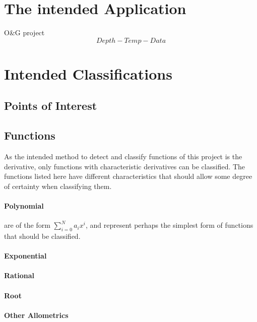 \documentclass[main.tex]{subfiles}
\begin{document}
    
  \section{The intended Application}
    
    O\&G project
    \[Depth-Temp-Data\]
    
  \section{Intended Classifications}
    
    \subsection{Points of Interest}  
      
    \subsection{Functions}
      
      As the intended method to detect and classify functions of this project is the derivative, only functions with characteristic derivatives can be classified. The functions listed here have different characteristics that should allow some degree of certainty when classifying them.
      \paragraph{Polynomial} are of the form $\sum_{i=0}^{N} a_i x^i$, and represent perhaps the simplest form of functions that should be classified. 
      \paragraph{Exponential}
      \paragraph{Rational}
      \paragraph{Root}
      \paragraph{Other Allometrics}
    
\end{document}
